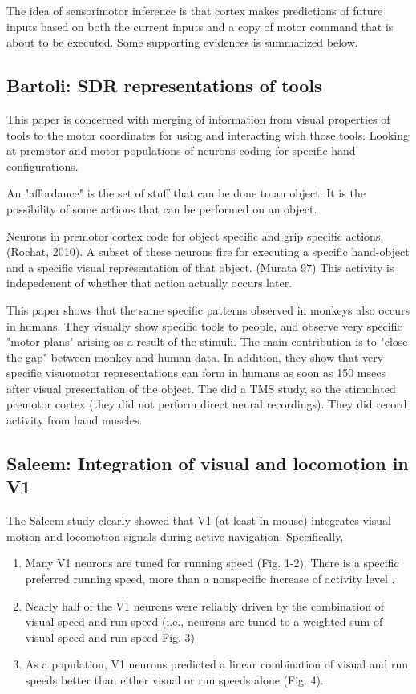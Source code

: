 \documentclass{article} %
\begin{document}
The idea of sensorimotor inference is that cortex makes predictions of future
inputs based on both the current inputs and a copy of motor command that is
about to be executed.  Some supporting evidences is summarized below.

\subsection{Bartoli: SDR representations of tools}

This paper \cite{Bartoli2014} is concerned with merging of information from
visual properties of tools to the motor coordinates for using and interacting
with those tools. Looking at premotor and motor populations of neurons coding
for specific hand configurations.

An "affordance" is the set of stuff that can be done to an object.  It is the
possibility of some actions that can be performed on an object.

Neurons in premotor cortex code for object specific and grip specific actions.
(Rochat, 2010). A subset of these neurons fire for executing a specific
hand-object and a specific visual representation of that object. (Murata 97)
This activity is indepedenent of whether that action actually occurs later.

This paper shows that the same specific patterns observed in monkeys also occurs
in humans.  They visually show specific tools to people, and observe very
specific "motor plans" arising as a result of the stimuli. The main contribution
is to "close the gap" between monkey and human data. In addition, they show that
very specific visuomotor representations can form in humans as soon as 150 msecs
after visual presentation of the object.  The did a TMS study, so the stimulated
premotor cortex (they did not perform direct neural recordings).  They did
record activity from hand muscles.

\subsection{Saleem: Integration of visual and locomotion in V1}

The Saleem study \cite{Saleem2013} clearly showed that V1 (at least in mouse) 
integrates visual motion and locomotion signals during active navigation. Specifically,

\begin{enumerate}
\item Many V1 neurons are tuned for running speed (Fig. 1-2). There is a specific preferred 
running speed, more than a nonspecific increase of activity level \cite{Niell2010}.
\item Nearly half of the V1 neurons were reliably driven by the combination of visual speed and 
run speed (i.e., neurons are tuned to a weighted sum of visual speed and run speed Fig. 3)
\item As a population, V1 neurons predicted a linear combination of visual and run 
speeds better than either visual or run speeds alone (Fig. 4).
\end{enumerate}
\end{document}
